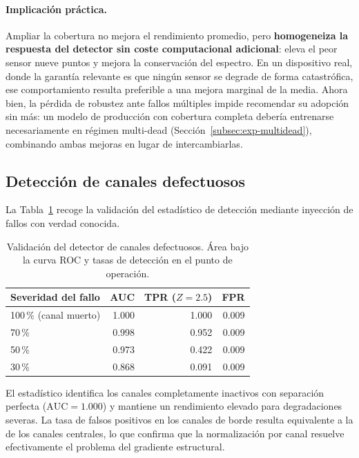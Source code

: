 \paragraph{Implicación práctica.} Ampliar la cobertura no mejora el rendimiento promedio, pero
\textbf{homogeneiza la respuesta del detector sin coste computacional adicional}: eleva el peor
sensor nueve puntos y mejora la conservación del espectro. En un dispositivo real, donde la garantía
relevante es que ningún sensor se degrade de forma catastrófica, ese comportamiento resulta
preferible a una mejora marginal de la media. Ahora bien, la pérdida de robustez ante fallos
múltiples impide recomendar su adopción sin más: un modelo de producción con cobertura completa
debería entrenarse necesariamente en régimen multi-dead
(Sección~\ref{subsec:exp-multidead}), combinando ambas mejoras en lugar de intercambiarlas.

\subsection{Detección de canales defectuosos}
\label{subsec:res-bad}

La Tabla~\ref{tab:res-bad-roc} recoge la validación del estadístico de detección mediante inyección
de fallos con verdad conocida.

\begin{table}[htbp]
\centering
\caption{Validación del detector de canales defectuosos. Área bajo la curva ROC y tasas de
detección en el punto de operación.}
\label{tab:res-bad-roc}
\begin{tabular}{lrrr}
\toprule
\textbf{Severidad del fallo} & \textbf{AUC} & \textbf{TPR} ($Z=2.5$) & \textbf{FPR} \\
\midrule
100\,\% (canal muerto) & 1.000 & 1.000 & 0.009 \\
70\,\% & 0.998 & 0.952 & 0.009 \\
50\,\% & 0.973 & 0.422 & 0.009 \\
30\,\% & 0.868 & 0.091 & 0.009 \\
\bottomrule
\end{tabular}
\end{table}

El estadístico identifica los canales completamente inactivos con separación perfecta
($\mathrm{AUC} = 1.000$) y mantiene un rendimiento elevado para degradaciones severas. La tasa de
falsos positivos en los canales de borde resulta equivalente a la de los canales centrales, lo que
confirma que la normalización por canal resuelve efectivamente el problema del gradiente
estructural.

